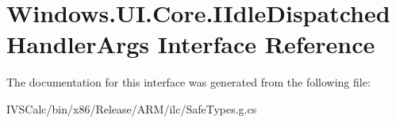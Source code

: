 \hypertarget{interface_windows_1_1_u_i_1_1_core_1_1_i_idle_dispatched_handler_args}{}\section{Windows.\+U\+I.\+Core.\+I\+Idle\+Dispatched\+Handler\+Args Interface Reference}
\label{interface_windows_1_1_u_i_1_1_core_1_1_i_idle_dispatched_handler_args}


The documentation for this interface was generated from the following file\+:\begin{DoxyCompactItemize}
\item 
I\+V\+S\+Calc/bin/x86/\+Release/\+A\+R\+M/ilc/Safe\+Types.\+g.\+cs\end{DoxyCompactItemize}
